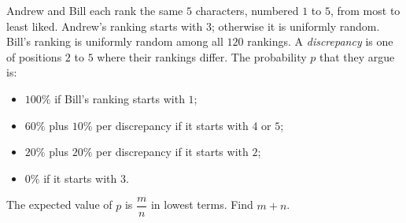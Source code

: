 Andrew and Bill each rank the same $5$ characters, numbered $1$ to $5$, from most to least liked. Andrew's ranking starts with $3$; otherwise it is uniformly random. Bill's ranking is uniformly random among all $120$ rankings. A \emph{discrepancy} is one of positions $2$ to $5$ where their rankings differ. The probability $p$ that they argue is:
\begin{itemize}
\item $100\%$ if Bill's ranking starts with $1$;
\item $60\%$ plus $10\%$ per discrepancy if it starts with $4$ or $5$;
\item $20\%$ plus $20\%$ per discrepancy if it starts with $2$;
\item $0\%$ if it starts with $3$.
\end{itemize}
The expected value of $p$ is $\dfrac mn$ in lowest terms. Find $m+n$.
